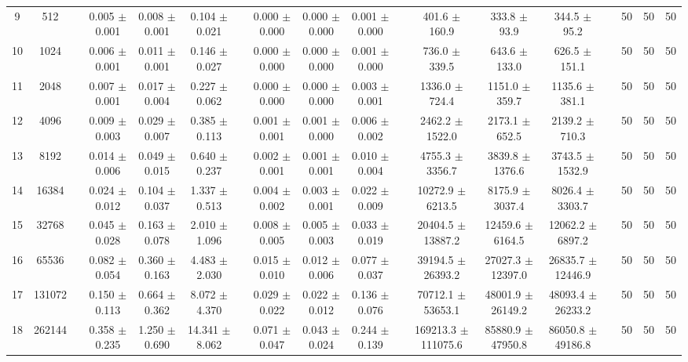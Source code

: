 \documentclass[11pt]{article}
\begin{document}
\begin{landscape}
\begin{table}
\begin{tabular}{cccccccccccccccccc}
 9 &     512 &&  0.005 $\pm$ 0.001 & 0.008 $\pm$ 0.001 & 0.104 $\pm$ 0.021 &&  0.000 $\pm$ 0.000 & 0.000 $\pm$ 0.000 & 0.001 $\pm$ 0.000 &&  401.6 $\pm$ 160.9 & 333.8 $\pm$ 93.9 & 344.5 $\pm$ 95.2 && 50& 50& 50\\
10 &    1024 &&  0.006 $\pm$ 0.001 & 0.011 $\pm$ 0.001 & 0.146 $\pm$ 0.027 &&  0.000 $\pm$ 0.000 & 0.000 $\pm$ 0.000 & 0.001 $\pm$ 0.000 &&  736.0 $\pm$ 339.5 & 643.6 $\pm$ 133.0 & 626.5 $\pm$ 151.1 && 50& 50& 50\\
11 &    2048 &&  0.007 $\pm$ 0.001 & 0.017 $\pm$ 0.004 & 0.227 $\pm$ 0.062 &&  0.000 $\pm$ 0.000 & 0.000 $\pm$ 0.000 & 0.003 $\pm$ 0.001 &&  1336.0 $\pm$ 724.4 & 1151.0 $\pm$ 359.7 & 1135.6 $\pm$ 381.1 && 50& 50& 50\\
12 &    4096 &&  0.009 $\pm$ 0.003 & 0.029 $\pm$ 0.007 & 0.385 $\pm$ 0.113 &&  0.001 $\pm$ 0.001 & 0.001 $\pm$ 0.000 & 0.006 $\pm$ 0.002 &&  2462.2 $\pm$ 1522.0 & 2173.1 $\pm$ 652.5 & 2139.2 $\pm$ 710.3 && 50& 50& 50\\
13 &    8192 &&  0.014 $\pm$ 0.006 & 0.049 $\pm$ 0.015 & 0.640 $\pm$ 0.237 &&  0.002 $\pm$ 0.001 & 0.001 $\pm$ 0.001 & 0.010 $\pm$ 0.004 &&  4755.3 $\pm$ 3356.7 & 3839.8 $\pm$ 1376.6 & 3743.5 $\pm$ 1532.9 && 50& 50& 50\\
14 &   16384 &&  0.024 $\pm$ 0.012 & 0.104 $\pm$ 0.037 & 1.337 $\pm$ 0.513 &&  0.004 $\pm$ 0.002 & 0.003 $\pm$ 0.001 & 0.022 $\pm$ 0.009 &&  10272.9 $\pm$ 6213.5 & 8175.9 $\pm$ 3037.4 & 8026.4 $\pm$ 3303.7 && 50& 50& 50\\
15 &   32768 &&  0.045 $\pm$ 0.028 & 0.163 $\pm$ 0.078 & 2.010 $\pm$ 1.096 &&  0.008 $\pm$ 0.005 & 0.005 $\pm$ 0.003 & 0.033 $\pm$ 0.019 &&  20404.5 $\pm$ 13887.2 & 12459.6 $\pm$ 6164.5 & 12062.2 $\pm$ 6897.2 && 50& 50& 50\\
16 &   65536 &&  0.082 $\pm$ 0.054 & 0.360 $\pm$ 0.163 & 4.483 $\pm$ 2.030 &&  0.015 $\pm$ 0.010 & 0.012 $\pm$ 0.006 & 0.077 $\pm$ 0.037 &&  39194.5 $\pm$ 26393.2 & 27027.3 $\pm$ 12397.0 & 26835.7 $\pm$ 12446.9 && 50& 50& 50\\
17 &  131072 &&  0.150 $\pm$ 0.113 & 0.664 $\pm$ 0.362 & 8.072 $\pm$ 4.370 &&  0.029 $\pm$ 0.022 & 0.022 $\pm$ 0.012 & 0.136 $\pm$ 0.076 &&  70712.1 $\pm$ 53653.1 & 48001.9 $\pm$ 26149.2 & 48093.4 $\pm$ 26233.2 && 50& 50& 50\\
18 &  262144 &&  0.358 $\pm$ 0.235 & 1.250 $\pm$ 0.690 & 14.341 $\pm$ 8.062 &&  0.071 $\pm$ 0.047 & 0.043 $\pm$ 0.024 & 0.244 $\pm$ 0.139 &&  169213.3 $\pm$ 111075.6 & 85880.9 $\pm$ 47950.8 & 86050.8 $\pm$ 49186.8 && 50& 50& 50\\

\end{tabular}
\end{table}
\end{landscape}
\end{document}
